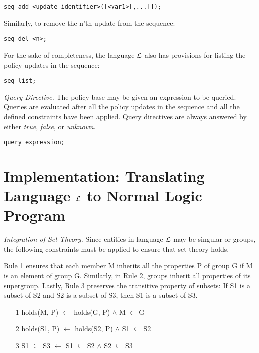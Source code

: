 \documentclass{llncs}
\begin{document}
    \begin{verbatim}seq add <update-identifier>([<var1>[,...]]);\end{verbatim}

    Similarly, to remove the n'th update from the sequence:

    \begin{verbatim}seq del <n>;\end{verbatim}

    For the sake of completeness, the language $\cal{L}$ also has provisions
    for listing the policy updates in the sequence:

    \begin{verbatim}seq list;\end{verbatim}

    \emph{Query Directive.} The policy base may be given an expression to be
    queried. Queries are evaluated after all the policy updates in the
    sequence and all the defined constraints have been applied. Query
    directives are always answered by either \emph{true}, \emph{false}, or
    \emph{unknown}.

    \begin{verbatim}query expression;\end{verbatim}

  \section{Implementation: Translating Language $\cal{L}$ to Normal Logic Program}

    \emph{Integration of Set Theory.} Since entities in language $\cal{L}$ may 
    be singular or groups, the following constraints must be applied to ensure
    that set theory holds.

    Rule 1 ensures that each member M inherits all the properties P of group G 
    if M is an element of group G. Similarly, in Rule 2, groups inherit all
    properties of its supergroup. Lastly, Rule 3 preserves the transitive
    property of subsets: If S1 is a subset of S2 and S2 is a subset of S3,
    then S1 is a subset of S3.

    \begin{enumerate}
      \item[1]
        holds(M, P) $\leftarrow$ holds(G, P) $\land$ M $\in$ G
      \item[2]
        holds(S1, P) $\leftarrow$ holds(S2, P) $\land$ S1 $\subseteq$ S2
      \item[3]
        S1 $\subseteq$ S3 $\leftarrow$ S1 $\subseteq$ S2 $\land$ S2
        $\subseteq$ S3
    \end{enumerate}
\end{document}

